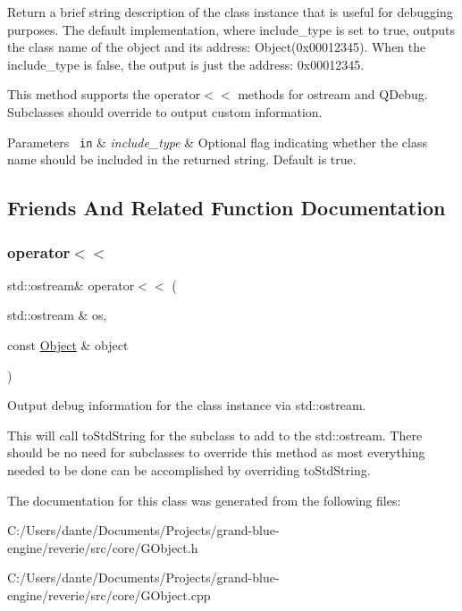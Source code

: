 Return a brief string description of the class instance that is useful for debugging purposes. The default implementation, where include\+\_\+type is set to true, outputs the class name of the object and its address\+: Object(0x00012345). When the include\+\_\+type is false, the output is just the address\+: 0x00012345.

This method supports the operator$<$$<$ methods for ostream and Q\+Debug. Subclasses should override to output custom information.


\begin{DoxyParams}[1]{Parameters}
\mbox{\texttt{ in}}  & {\em include\+\_\+type} & Optional flag indicating whether the class name should be included in the returned string. Default is true. \\
\hline
\end{DoxyParams}


\subsection{Friends And Related Function Documentation}
\mbox{\label{classrev_1_1_object_a9f6a5f5e48e10f088c819edd560f530f}} 
\subsubsection{\texorpdfstring{operator$<$$<$}{operator<<}}
{\footnotesize\ttfamily std\+::ostream\& operator$<$$<$ (\begin{DoxyParamCaption}\item[{std\+::ostream \&}]{os,  }\item[{const \mbox{\hyperlink{classrev_1_1_object}{Object}} \&}]{object }\end{DoxyParamCaption})\hspace{0.3cm}{\ttfamily [friend]}}



Output debug information for the class instance via std\+::ostream. 

This will call to\+Std\+String for the subclass to add to the std\+::ostream. There should be no need for subclasses to override this method as most everything needed to be done can be accomplished by overriding to\+Std\+String. 

The documentation for this class was generated from the following files\+:\begin{DoxyCompactItemize}
\item 
C\+:/\+Users/dante/\+Documents/\+Projects/grand-\/blue-\/engine/reverie/src/core/G\+Object.\+h\item 
C\+:/\+Users/dante/\+Documents/\+Projects/grand-\/blue-\/engine/reverie/src/core/G\+Object.\+cpp\end{DoxyCompactItemize}
